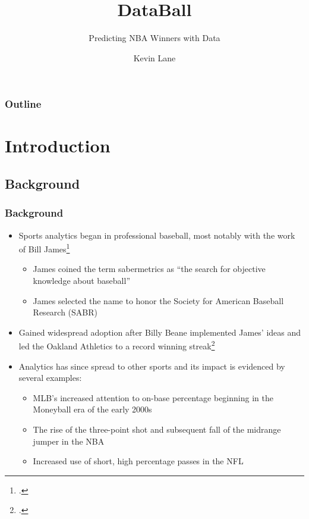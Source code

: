 \documentclass{beamer}
\title{DataBall}
\subtitle{Predicting NBA Winners with Data}
\author{Kevin Lane}
\begin{document}
\begin{frame}
\titlepage
\end{frame}

\begin{frame}
\frametitle{Outline}
\tableofcontents
\end{frame}

\section{Introduction}

\subsection{Background}
\begin{frame}
\frametitle{Background}
\begin{itemize}
    \item Sports analytics began in professional baseball, most notably with the work of Bill James\footcite{james}
    \begin{itemize}
        \item James coined the term sabermetrics as ``the search for objective knowledge about baseball''
        \item James selected the name to honor the Society for American Baseball Research (SABR)
    \end{itemize}
    \item Gained widespread adoption after Billy Beane implemented James' ideas and led the Oakland Athletics to a record winning streak\footcite{lewis}
    \item Analytics has since spread to other sports and its impact is evidenced by several examples:
    \begin{itemize}
        \item MLB's increased attention to on-base percentage beginning in the Moneyball era of the early 2000s
        \item The rise of the three-point shot and subsequent fall of the midrange jumper in the NBA
        \item Increased use of short, high percentage passes in the NFL
    \end{itemize}
\end{itemize}
\end{frame}
\end{document}
